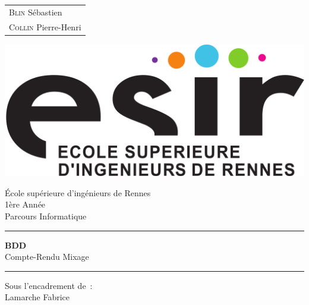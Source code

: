 \documentclass{article}
\begin{document}
\begin{titlepage}
	\vspace{-20px}
	\begin{tabular}{l}
		\textsc{Blin} S\'ebastien\\
		\textsc{Collin} Pierre-Henri
	\end{tabular}
	\hfill \vspace{10px}\includegraphics[scale=0.1]{esir.png}\\
	\vfill
	\begin{center}
		\Huge{\'Ecole sup\'erieure d'ing\'enieurs de Rennes}\\
		\vspace{1cm}
		\LARGE{1\`ere Ann\'ee}\\
		\large{Parcours Informatique}\\
		\vspace{0.5cm}\hrule\vspace{0.5cm}
		\LARGE{\textbf{BDD}}\\
		\Large{Compte-Rendu Mixage}
		\vspace{0.5cm}\hrule
		\vfill
		\vfill
	\end{center}
	\begin{flushleft}
		\Large{Sous l'encadrement de~:}\\
		\vspace{0.2cm}
		\large{{Lamarche} Fabrice}
	\end{flushleft}
	\vfill
\end{titlepage}
\end{document}
